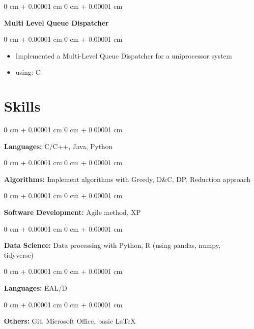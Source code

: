\documentclass[10pt, letterpaper]{article}
\newenvironment{highlights}{
    \begin{itemize}[
        topsep=0.10 cm,
        parsep=0.10 cm,
        partopsep=0pt,
        itemsep=0pt,
        leftmargin=0 cm + 10pt
    ]
}{
    \end{itemize}
} %
\newenvironment{onecolentry}{
    \begin{adjustwidth}{
        0 cm + 0.00001 cm
    }{
        0 cm + 0.00001 cm
    }
}{
    \end{adjustwidth}
} %
\newenvironment{twocolentry}[2][]{
    \onecolentry
    \def\secondColumn{#2}
    \setcolumnwidth{\fill, 4.5 cm}
    \begin{paracol}{2}
}{
    \switchcolumn \raggedleft \secondColumn
    \end{paracol}
    \endonecolentry
} %
\begin{document}
        \begin{twocolentry}{}
            \textbf{Multi Level Queue Dispatcher}
        \end{twocolentry}
        \vspace{0.10 cm}
        \begin{onecolentry}
            \begin{highlights}
                \item Implemented a Multi-Level Queue Dispatcher for a uniprocessor system 
                \item using: C
            \end{highlights}
        \end{onecolentry} 
        \vspace{0.2 cm}



    \section{Skills}
        \begin{onecolentry}
            \textbf{Languages:} C/C++, Java, Python
        \end{onecolentry}

        \vspace{0.2 cm}

        \begin{onecolentry}
            \textbf{Algorithms:} Implement algorithms with Greedy, D\&C, DP, Reduction approach
        \end{onecolentry}
        \vspace{0.2 cm}

        \begin{onecolentry}
            \textbf{Software Development:} Agile method, XP
        \end{onecolentry}
        \vspace{0.2 cm}

        \begin{onecolentry}
            \textbf{Data Science:} Data processing with Python, R (using pandas, numpy, tidyverse) 
        \end{onecolentry}
        \vspace{0.2 cm}

        \begin{onecolentry}
            \textbf{Languages:} EAL/D
        \end{onecolentry}
        \vspace{0.2 cm}

        \begin{onecolentry}
            \textbf{Others:} Git, Microsoft Office, basic LaTeX
        \end{onecolentry}
\end{document}
